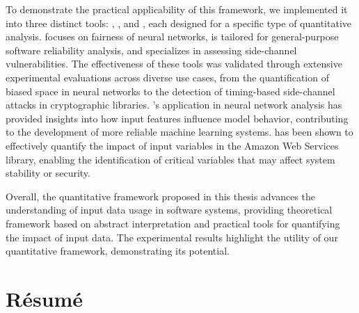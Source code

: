 To demonstrate the practical applicability of this framework, we implemented it into three distinct tools: \libra, \impatto, and \timesec, each designed for a specific type of quantitative analysis. \libra{} focuses on fairness of neural networks, \impatto{} is tailored for general-purpose software reliability analysis, and \timesec{} specializes in assessing side-channel vulnerabilities. The effectiveness of these tools was validated through extensive experimental evaluations across diverse use cases, from the quantification of biased space in neural networks to the detection of timing-based side-channel attacks in cryptographic libraries.
\libra's application in neural network analysis has provided insights into how input features influence model behavior, contributing to the development of more reliable machine learning systems.
\timesec{} has been shown to effectively quantify the impact of input variables in the Amazon Web Services \bignum{} library, enabling the identification of critical variables that may affect system stability or security.

Overall, the quantitative framework proposed in this thesis advances the understanding of input data usage in software systems, providing theoretical framework based on abstract interpretation and practical tools for quantifying the impact of input data. The experimental results highlight the utility of our quantitative framework, demonstrating its potential.


\chapter*{Résumé}

